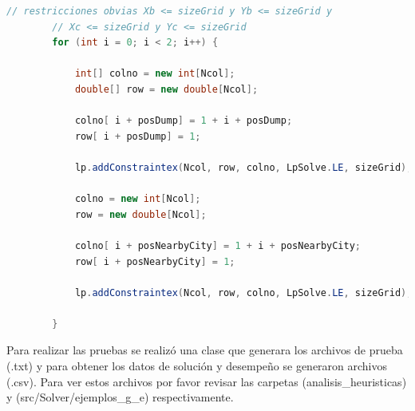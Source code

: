 \documentclass[10pt]{article}
\begin{document}
\begin{lstlisting}[language=Java]
// restricciones obvias Xb <= sizeGrid y Yb <= sizeGrid y
        // Xc <= sizeGrid y Yc <= sizeGrid
        for (int i = 0; i < 2; i++) {

            int[] colno = new int[Ncol];
            double[] row = new double[Ncol];

            colno[ i + posDump] = 1 + i + posDump;
            row[ i + posDump] = 1;

            lp.addConstraintex(Ncol, row, colno, LpSolve.LE, sizeGrid);

            colno = new int[Ncol];
            row = new double[Ncol];

            colno[ i + posNearbyCity] = 1 + i + posNearbyCity;
            row[ i + posNearbyCity] = 1;

            lp.addConstraintex(Ncol, row, colno, LpSolve.LE, sizeGrid); //Se añade la restricción al modelo

        }
\end{lstlisting}

Para realizar las pruebas se realizó una clase que generara los archivos de prueba (.txt) y para obtener los datos de solución y desempeño se generaron archivos (.csv). Para ver estos
archivos por favor revisar las carpetas (analisis\_heuristicas) y (src/Solver/ejemplos\_g\_e) respectivamente.

\newpage
\end{document}
